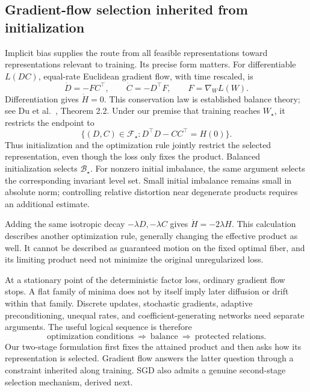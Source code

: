 \subsection{Gradient-flow selection inherited from initialization}
Implicit bias supplies the route from all feasible representations toward representations relevant to training. Its precise form matters. For differentiable $L(DC)$, equal-rate Euclidean gradient flow, with time rescaled, is
\begin{equation}
 \dot D=-FC^\top,\qquad \dot C=-D^\top F,
 \qquad F=\nabla_WL(W).
\end{equation}
Differentiation gives $\dot H=0$. This conservation law is established balance theory; see Du et al.~\cite{du}, Theorem 2.2. Under our premise that training reaches $W_\star$, it restricts the endpoint to
\[
 \{(D,C)\in\mathcal F_\star:D^\top D-CC^\top=H(0)\}.
\]
Thus initialization and the optimization rule jointly restrict the selected representation, even though the loss only fixes the product. Balanced initialization selects $\mathcal B_\star$. For nonzero initial imbalance, the same argument selects the corresponding invariant level set. Small initial imbalance remains small in absolute norm; controlling relative distortion near degenerate products requires an additional estimate.

Adding the same isotropic decay $-\lambda D,-\lambda C$ gives $\dot H=-2\lambda H$. This calculation describes another optimization rule, generally changing the effective product as well. It cannot be described as guaranteed motion on the fixed optimal fiber, and its limiting product need not minimize the original unregularized loss.

At a stationary point of the deterministic factor loss, ordinary gradient flow stops. A flat family of minima does not by itself imply later diffusion or drift within that family. Discrete updates, stochastic gradients, adaptive preconditioning, unequal rates, and coefficient-generating networks need separate arguments. The useful logical sequence is therefore
\[
 \text{optimization conditions}\ \Longrightarrow\ \text{balance}\ \Longrightarrow\ \text{protected relations}.
\]
Our two-stage formulation first fixes the attained product and then asks how its representation is selected. Gradient flow answers the latter question through a constraint inherited along training. SGD also admits a genuine second-stage selection mechanism, derived next.

